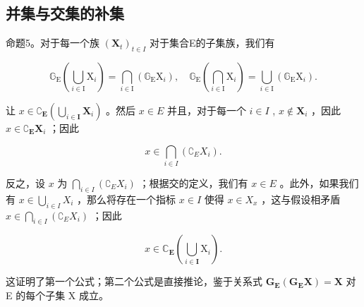 \subsection{并集与交集的补集}

命题5。对于每一个族 \((\mathbf{X}_t)_{t\in I}\) 对于集合E的子集族，我们有

\[
\mathbb {G} _ {\mathrm{E}} \left(\bigcup_ {i \in \mathrm{I}} \mathrm{X} _ {i}\right) = \bigcap_ {i \in \mathrm{I}} \left(\mathbb {G} _ {\mathrm{E}} \mathrm{X} _ {i}\right), \quad \mathbb {G} _ {\mathrm{E}} \left(\bigcap_ {i \in \mathrm{I}} \mathrm{X} _ {i}\right) = \bigcup_ {i \in \mathrm{I}} \left(\mathbb {G} _ {\mathrm{E}} \mathrm{X} _ {i}\right).
\]

让 \(x \in \complement_{\mathbf{E}} \left( \bigcup_{i \in \mathbf{I}} \mathbf{X}_i \right)\) 。然后 \(x \in E\) 并且，对于每一个 \(i \in I\) , \(x \notin \mathbf{X}_i\) ，因此 \(x \in \complement_{\mathbf{E}} \mathbf{X}_i\) ；因此

\[
x \in \bigcap_ {i \in I} \left(\complement_ {E} X _ {i}\right).
\]

反之，设 \(x\) 为 \(\bigcap_{i \in I} (\complement_E X_i)\) ；根据交的定义，我们有 \(x \in E\) 。此外，如果我们有 \(x \in \bigcup_{i \in I} X_i\) ，那么将存在一个指标 \(x \in I\) 使得 \(x \in X_x\) ，这与假设相矛盾 \(x \in \bigcap_{i \in I} (\complement_E X_i)\) ；因此

\[
x \in \mathbb {C} _ {\mathbf {E}} \left(\bigcup_ {i \in \mathbf {I}} \mathrm{X} _ {i}\right).
\]

这证明了第一个公式；第二个公式是直接推论，鉴于关系式 \(\mathbf{G}_{\mathbf{E}}(\mathbf{G}_{\mathbf{E}}\mathbf{X})=\mathbf{X}\) 对 E 的每个子集 X 成立。

